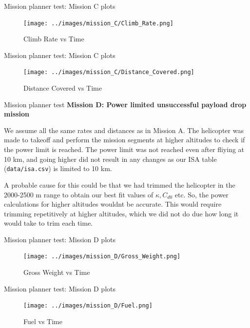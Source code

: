 \documentclass{beamer}
\begin{document}
\begin{frame}{Mission planner test: Mission C plots}
  \begin{figure}
    \centering
    \texttt{[image: ../images/mission\_C/Climb\_Rate.png]}
    \caption{Climb Rate vs Time}
  \end{figure}
\end{frame}

\begin{frame}{Mission planner test: Mission C plots}
  \begin{figure}
    \centering
    \texttt{[image: ../images/mission\_C/Distance\_Covered.png]}
    \caption{Distance Covered vs Time}
  \end{figure}
\end{frame}

\begin{frame}{Mission planner test}
  \textbf{Mission D: Power limited unsuccessful payload drop mission}

  We assume all the same rates and distances as in Mission A. The helicopter was made to takeoff and perform the mission segments at higher altitudes to check if the power limit is reached. The power limit was not reached even after fliying at 10 km, and going higher did not result in any changes as our ISA table (\texttt{data/isa.csv}) is limited to 10 km. 

  A probable cause for this could be that we had trimmed the helicopter in the 2000-2500 m range to obtain our best fit values of $\kappa, C_{d0}$ etc. So, the power calculations for higher altitudes wouldnt be accurate. This would require trimming repetitively at higher altitudes, which we did not do due how long it would take to trim each time.

\end{frame}

\begin{frame}{Mission planner test: Mission D plots}
  \begin{figure}
    \centering
    \texttt{[image: ../images/mission\_D/Gross\_Weight.png]}
    \caption{Gross Weight vs Time}
  \end{figure}
\end{frame}

\begin{frame}{Mission planner test: Mission D plots}
  \begin{figure}
    \centering
    \texttt{[image: ../images/mission\_D/Fuel.png]}
    \caption{Fuel vs Time}
  \end{figure}
\end{frame}
\end{document}
